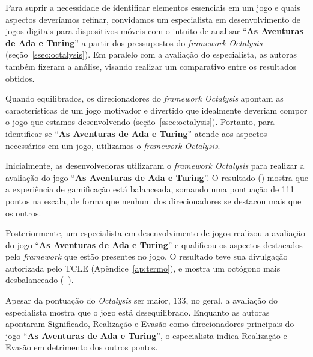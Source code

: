 Para suprir a necessidade de identificar elementos essenciais em um jogo e quais aspectos deveríamos refinar, convidamos um especialista em desenvolvimento de jogos digitais para dispositivos móveis com o intuito de analisar “\textbf{As Aventuras de Ada e Turing}” a partir dos pressupostos do \textit{framework Octalysis} (seção~\ref{ssec:octalysis}). Em paralelo com a avaliação do especialista, as autoras também fizeram a análise, visando realizar um comparativo entre os resultados obtidos.

Quando equilibrados, os direcionadores do \textit{framework Octalysis} apontam as características de um jogo motivador e divertido que idealmente deveriam compor o jogo que estamos desenvolvendo (seção~\ref{ssec:octalysis}).  Portanto, para identificar se “\textbf{As Aventuras de Ada e Turing}” atende aos aspectos necessários em um jogo, utilizamos o \textit{framework Octalysis}.

Inicialmente, as desenvolvedoras utilizaram o \textit{framework Octalysis} para realizar a avaliação do jogo “\textbf{As Aventuras de Ada e Turing}”. O resultado () mostra que a experiência de gamificação está balanceada, somando uma pontuação de 111 pontos na escala, de forma que nenhum dos direcionadores se destacou mais que os outros.


Posteriormente, um especialista em desenvolvimento de jogos realizou a avaliação do jogo “\textbf{As Aventuras de Ada e Turing}” e qualificou os aspectos destacados pelo \textit{framework} que estão presentes no jogo. O resultado teve sua divulgação autorizada pelo \acrfull{TCLE} (Apêndice~\ref{ap:termo}), e mostra um octógono mais desbalanceado (~).

Apesar da pontuação do \textit{Octalysis} ser maior, 133, no geral, a avaliação do especialista mostra que o jogo está desequilibrado. Enquanto as autoras apontaram Significado, Realização e Evasão como direcionadores principais do jogo “\textbf{As Aventuras de Ada e Turing}”, o especialista indica Realização e Evasão em detrimento dos outros pontos.

